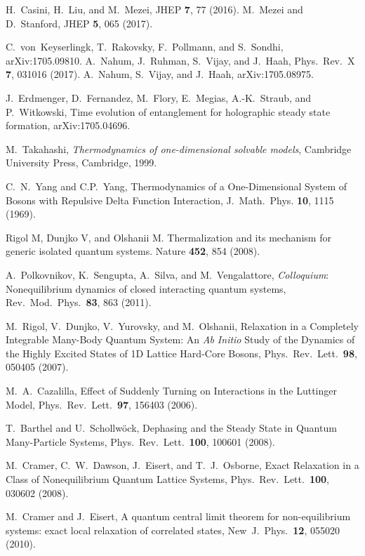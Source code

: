 \documentclass[twocolumn,superscriptaddress,prb,10pt]{revtex4-1}
\begin{document}
\begin{thebibliography}{99}
H.~Casini, H.~Liu, and M.~Mezei, JHEP {\bf 7}, 77 (2016). 
M.~Mezei and D.~Stanford, JHEP {\bf 5}, 065 (2017). 

C.~von~Keyserlingk, T.~Rakovsky, F.~Pollmann, and S.~Sondhi, 
arXiv:1705.09810. A.~Nahum, J.~Ruhman, S.~Vijay, and J.~Haah, 
Phys.\ Rev.\ X {\bf 7}, 031016 (2017). A.~Nahum, S.~Vijay, and 
J.~Haah, arXiv:1705.08975. 


J.~Erdmenger, D.~Fernandez, M.~Flory, E.~Megias, A.-K.~Straub, and P.~Witkowski,  
Time evolution of entanglement for holographic steady state formation, 
arXiv:1705.04696. 

M.~Takahashi, {\it Thermodynamics of one-dimensional solvable models},
Cambridge University Press, Cambridge, 1999. 

	C.~N.~Yang and C.P.~Yang, Thermodynamics of a One-Dimensional System of
	Bosons with Repulsive Delta Function Interaction, J.\ Math.\ Phys. {\bf 10}, 1115 (1969).

	Rigol M, Dunjko V, and Olshanii M. Thermalization and its mechanism for generic isolated
	quantum systems. Nature {\bf 452}, 854 (2008). 

	A.~Polkovnikov, K.~Sengupta, A.~Silva, and M.~Vengalattore,
	{\it Colloquium}: Nonequilibrium dynamics of closed interacting quantum systems, 
	Rev.\ Mod.\ Phys.\ {\bf 83}, 863 (2011).

	M.~Rigol, V.~Dunjko, V.~Yurovsky, and M.~Olshanii, Relaxation in a Completely
	Integrable Many-Body Quantum System: An {\it Ab Initio} Study of the Dynamics of
	the Highly Excited States of 1D Lattice Hard-Core Bosons,
	Phys.\ Rev.\ Lett.\ {\bf 98}, 050405 (2007).

	M.~A.~Cazalilla, 
	Effect of Suddenly Turning on Interactions in the Luttinger Model, 
	Phys.\ Rev.\ Lett.\ {\bf 97}, 156403 (2006).

	T.~Barthel and U.~Schollw\"ock, 
	Dephasing and the Steady State in Quantum Many-Particle Systems, 
	Phys.\ Rev.\ Lett.\ {\bf 100}, 100601 (2008).

	M.~Cramer, C.~W.~Dawson, J.~Eisert, and T.~J.~Osborne, 
	Exact Relaxation in a Class of Nonequilibrium Quantum Lattice Systems, 
	Phys.\ Rev.\  Lett.\ {\bf 100}, 030602 (2008).

	M.~Cramer and J.~Eisert, 
	A quantum central limit theorem for non-equilibrium systems: exact local relaxation of correlated states, 
	New\ J.\ Phys.\ {\bf 12}, 055020 (2010).


\end{thebibliography}
\end{document}
